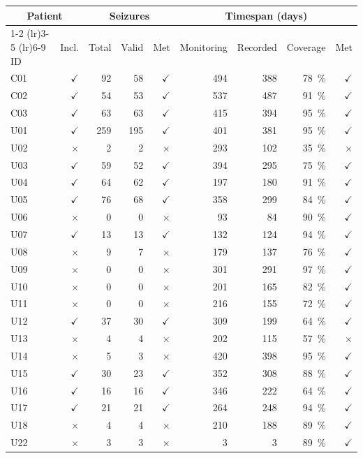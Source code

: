 \begin{tabular}{lr rrr rrrr}
\toprule
\multicolumn{2}{c}{Patient} & \multicolumn{3}{c}{Seizures} & \multicolumn{4}{c}{Timespan (days)} \\
\cmidrule(lr){1-2}            \cmidrule(lr){3-5}             \cmidrule(lr){6-9}
ID & Incl. & Total & Valid & Met & Monitoring & Recorded & Coverage & Met \\
\midrule
C01 & $\checkmark$ & 92 & 58 & $\checkmark$ & 494 & 388 & \SI{78}{\percent} & $\checkmark$ \\
C02 & $\checkmark$ & 54 & 53 & $\checkmark$ & 537 & 487 & \SI{91}{\percent} & $\checkmark$ \\
C03 & $\checkmark$ & 63 & 63 & $\checkmark$ & 415 & 394 & \SI{95}{\percent} & $\checkmark$ \\
U01 & $\checkmark$ & 259 & 195 & $\checkmark$ & 401 & 381 & \SI{95}{\percent} & $\checkmark$ \\
U02 & $\times$ & 2 & 2 & $\times$ & 293 & 102 & \SI{35}{\percent} & $\times$ \\
U03 & $\checkmark$ & 59 & 52 & $\checkmark$ & 394 & 295 & \SI{75}{\percent} & $\checkmark$ \\
U04 & $\checkmark$ & 64 & 62 & $\checkmark$ & 197 & 180 & \SI{91}{\percent} & $\checkmark$ \\
U05 & $\checkmark$ & 76 & 68 & $\checkmark$ & 358 & 299 & \SI{84}{\percent} & $\checkmark$ \\
U06 & $\times$ & 0 & 0 & $\times$ & 93 & 84 & \SI{90}{\percent} & $\checkmark$ \\
U07 & $\checkmark$ & 13 & 13 & $\checkmark$ & 132 & 124 & \SI{94}{\percent} & $\checkmark$ \\
U08 & $\times$ & 9 & 7 & $\times$ & 179 & 137 & \SI{76}{\percent} & $\checkmark$ \\
U09 & $\times$ & 0 & 0 & $\times$ & 301 & 291 & \SI{97}{\percent} & $\checkmark$ \\
U10 & $\times$ & 0 & 0 & $\times$ & 201 & 165 & \SI{82}{\percent} & $\checkmark$ \\
U11 & $\times$ & 0 & 0 & $\times$ & 216 & 155 & \SI{72}{\percent} & $\checkmark$ \\
U12 & $\checkmark$ & 37 & 30 & $\checkmark$ & 309 & 199 & \SI{64}{\percent} & $\checkmark$ \\
U13 & $\times$ & 4 & 4 & $\times$ & 202 & 115 & \SI{57}{\percent} & $\times$ \\
U14 & $\times$ & 5 & 3 & $\times$ & 420 & 398 & \SI{95}{\percent} & $\checkmark$ \\
U15 & $\checkmark$ & 30 & 23 & $\checkmark$ & 352 & 308 & \SI{88}{\percent} & $\checkmark$ \\
U16 & $\checkmark$ & 16 & 16 & $\checkmark$ & 346 & 222 & \SI{64}{\percent} & $\checkmark$ \\
U17 & $\checkmark$ & 21 & 21 & $\checkmark$ & 264 & 248 & \SI{94}{\percent} & $\checkmark$ \\
U18 & $\times$ & 4 & 4 & $\times$ & 210 & 188 & \SI{89}{\percent} & $\checkmark$ \\
U22 & $\times$ & 3 & 3 & $\times$ & 3 & 3 & \SI{89}{\percent} & $\checkmark$ \\
\bottomrule
\end{tabular}
